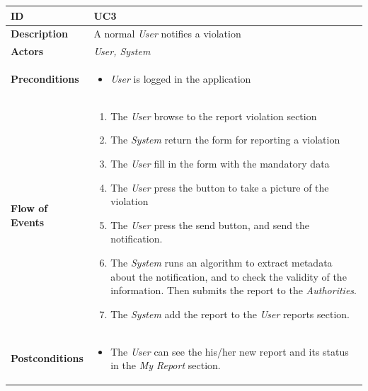 



\begin{table}[ht]
\begin{tabular}{|l|p{}|}
\hline
\textbf{ID}             & UC3                                                                             \\ \hline
\textbf{Description}    & A normal \textit{User} notifies a violation \\ \hline
\textbf{Actors}         &  \textit{User, System}                                                                       \\ \hline

\textbf{Preconditions}  &   \begin{itemize}

 \item \textit{User} is logged in the application
                 \end{itemize}     
                    \\ \hline
                    
\textbf{Flow of Events} &   \begin{enumerate}
    \item The \textit{User} browse to the report violation section
    \item The \textit{System} return the form for reporting a violation
    \item The \textit{User} fill in the form with the mandatory data
    \item The \textit{User} press the button to take a picture of the violation
    \item The \textit{User} press the send button, and send the notification.
    \item The \textit{System} runs an algorithm to extract metadata about the notification, and to check the validity of the information. Then submits the report to the \textit{Authorities}.
    \item The \textit{System} add the report to the \textit{User} reports section. 

\end{enumerate}                                                                             \\ \hline
\textbf{Postconditions} & \begin{itemize}
     
 \item The \textit{User} can see the his/her new report and its status in the \textit{My Report} section. 
 

\end{itemize}
\end{tabular}
\end{table}
